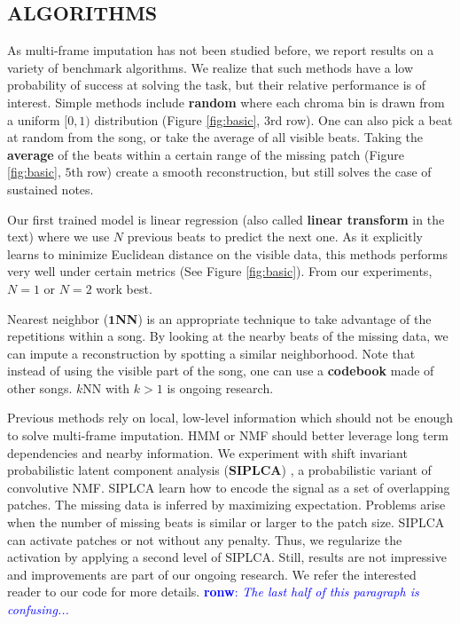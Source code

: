 \documentclass{article}
\newcommand{\FIXME}[2][FIXME]{\textcolor{blue}{\textbf{#1}: \emph{#2}}}
\begin{document}
\subsection{ALGORITHMS}
\label{ssec:algo}
As multi-frame imputation has not been studied before, we report
results on a variety of benchmark algorithms. We realize that such
methods have a low probability of success at solving the task, but
their relative performance is of interest.  Simple methods include
\textbf{random} where each chroma bin is drawn from a uniform $[0,1)$
distribution (Figure \ref{fig:basic}, $3$rd row).  One can also
pick a beat at random from the song, or take the average of all
visible beats. Taking the \textbf{average} of the beats within a certain
range of the missing patch (Figure \ref{fig:basic}, $5$th row)
create a smooth reconstruction, but still solves the case of
sustained notes.

Our first trained model is linear regression (also called
\textbf{linear transform} in the text) where we use $N$ previous beats
to predict the next one.  As it explicitly learns to minimize
Euclidean distance on the visible data, this methods performs very
well under certain metrics (See Figure \ref{fig:basic}). From our
experiments, $N=1$ or $N=2$ work best.

Nearest neighbor ($\mathbf{1}$\textbf{NN}) is an appropriate technique
to take advantage of the repetitions within a song. By looking at the
nearby beats of the missing data, we can impute a reconstruction by
spotting a similar neighborhood. Note that instead of using the
visible part of the song, one can use a \textbf{codebook} made of
other songs.  $k$NN with $k>1$ is ongoing research.

Previous methods rely on local, low-level information which should not
be enough to solve multi-frame imputation. HMM or NMF should better
leverage long term dependencies and nearby information.  We experiment
with shift invariant probabilistic latent component analysis
(\textbf{SIPLCA}) \cite{Smaragdis2009,Weiss2010}, a probabilistic
variant of convolutive NMF. SIPLCA learn how to encode the signal as a
set of overlapping patches. The missing data is inferred by maximizing
expectation.  Problems arise when the number of missing beats is
similar or larger to the patch size. SIPLCA can activate patches or
not without any penalty. Thus, we regularize the activation by
applying a second level of SIPLCA.  Still, results are not impressive
and improvements are part of our ongoing research. We refer the
interested reader to our code for more details.
\FIXME[ronw]{The last half of this paragraph is confusing...}
\end{document}
